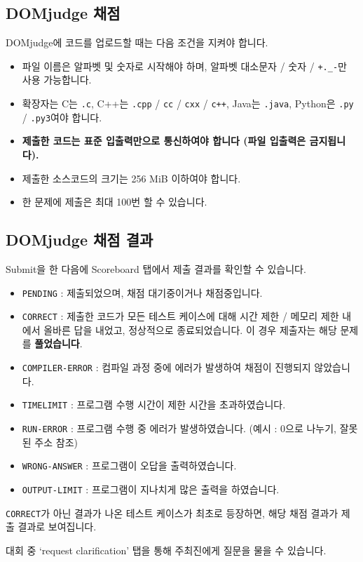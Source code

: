 \subsection*{DOMjudge 채점}
DOMjudge에 코드를 업로드할 때는 다음 조건을 지켜야 합니다.
\begin{itemize}
    \item 파일 이름은 알파벳 및 숫자로 시작해야 하며, 알파벳 대소문자 / 숫자 / \verb|+._-|만 사용 가능합니다.
    \item 확장자는 C는 \verb|.c|, C++는 \verb|.cpp| / \verb|cc| /  \verb|cxx| / \verb|c++|, Java는 \verb|.java|, Python은 \verb|.py| / \verb|.py3|여야 합니다.
    \item \textbf{제출한 코드는 표준 입출력만으로 통신하여야 합니다 (파일 입출력은 금지됩니다).}
    \item 제출한 소스코드의 크기는 256 MiB 이하여야 합니다.
    \item 한 문제에 제출은 최대 100번 할 수 있습니다.
\end{itemize}

\subsection*{DOMjudge 채점 결과}
Submit을 한 다음에 Scoreboard 탭에서 제출 결과를 확인할 수 있습니다.
\begin{itemize}
    \item {\color{gray}\texttt{PENDING}} : 제출되었으며, 채점 대기중이거나 채점중입니다.
    \item {\color{my-green}\texttt{CORRECT}} : 제출한 코드가 모든 테스트 케이스에 대해 시간 제한 / 메모리 제한 내에서 올바른 답을 내었고, 정상적으로 종료되었습니다. 이 경우 제출자는 해당 문제를 \textbf{풀었습니다}.
    \item {\color{red}\texttt{COMPILER-ERROR}} : 컴파일 과정 중에 에러가 발생하여 채점이 진행되지 않았습니다.
    \item {\color{red}\texttt{TIMELIMIT}} : 프로그램 수행 시간이 제한 시간을 초과하였습니다.
    \item {\color{red}\texttt{RUN-ERROR}} : 프로그램 수행 중 에러가 발생하였습니다. (예시 : 0으로 나누기, 잘못된 주소 참조)
    \item {\color{red}\texttt{WRONG-ANSWER}} : 프로그램이 오답을 출력하였습니다.
    \item {\color{red}\texttt{OUTPUT-LIMIT}} : 프로그램이 지나치게 많은 출력을 하였습니다.
\end{itemize}
{\color{my-green}\texttt{CORRECT}}가 아닌 결과가 나온 테스트 케이스가 최초로 등장하면, 해당 채점 결과가 제출 결과로 보여집니다.

대회 중 `request clarification' 탭을 통해 주최진에게 질문을 물을 수 있습니다.

